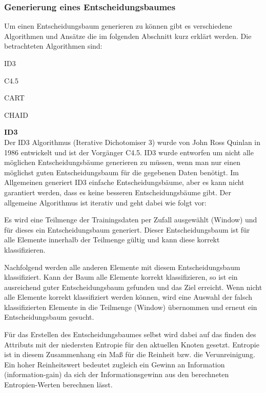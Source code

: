 \subsubsection{Generierung eines Entscheidungsbaumes}
\label{entscheidungsbaumAlgorithmen}
Um einen Entscheidungsbaum generieren zu können gibt es verschiedene Algorithmen und Ansätze die im folgenden Abschnitt kurz erklärt werden. Die betrachteten Algorithmen sind:
\begin{pitemize}
\item ID3
\item C4.5
\item CART
\item CHAID
\end{pitemize}

\textbf{ID3} \\
Der ID3 Algorithmus (Iterative Dichotomiser 3) wurde von John Ross Quinlan in 1986 entwickelt und ist der Vorgänger C4.5. ID3 wurde entworfen um nicht alle möglichen Entscheidungsbäume generieren zu müssen, wenn man nur einen möglichst guten Entscheidungsbaum für die gegebenen Daten benötigt. Im Allgemeinen generiert ID3 einfache Entscheidungsbäume, aber es kann nicht garantiert werden, dass es keine besseren Entscheidungsbäume gibt. Der allgemeine Algorithmus ist iterativ und geht dabei wie folgt vor: \cite{john_ross_quinlan_1986}

\begin{pitemize}
\item Es wird eine Teilmenge der Trainingsdaten per Zufall ausgewählt (Window) und für dieses ein Entscheidungsbaum generiert. Dieser Entscheidungsbaum ist für alle Elemente innerhalb der Teilmenge gültig und kann diese korrekt klassifizieren. 
\item Nachfolgend werden alle anderen Elemente mit diesem Entscheidungsbaum klassifiziert. Kann der Baum alle Elemente korrekt klassifizieren, so ist ein ausreichend guter Entscheidungsbaum gefunden und das Ziel erreicht. Wenn nicht alle Elemente korrekt klassifiziert werden können, wird eine Auswahl der falsch klassifizierten Elemente in die Teilmenge (Window) übernommen und erneut ein Entscheidungsbaum gesucht. 
\end{pitemize}

Für das Erstellen des Entscheidungsbaumes selbst wird dabei auf das finden des Attributs mit der niedersten Entropie für den aktuellen Knoten gesetzt. Entropie ist in diesem Zusammenhang ein Maß für die Reinheit bzw. die Verunreinigung. \cite{howard_hamilton_machine_2009} Ein hoher Reinheitswert bedeutet zugleich ein Gewinn an Information (information-gain) da sich der Informationsgewinn aus den berechneten Entropien-Werten berechnen lässt. \cite{thomas_mitchell_which_1997}

